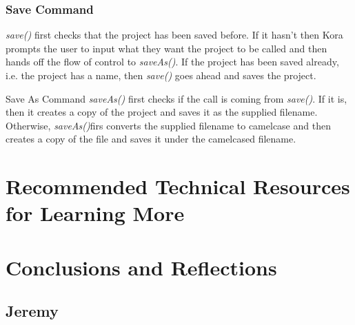 \documentclass[onecolumn, draftclsnofoot,10pt, compsoc]{IEEEtran}
\begin{document}
\subsubsection{Save Command} 
\textit{save()} first checks that the project has been saved before. If it hasn't then Kora prompts the user to input what they want the project to be called and then hands off the flow of control to \textit{saveAs()}. If the project has been saved already, i.e. the project has a name, then \textit{save()} goes ahead and saves the project.


Save As Command  
\textit{saveAs()} first checks if the call is coming from \textit{save()}. If it is, then it creates a copy of the project and saves it as the supplied filename. Otherwise, \textit{saveAs()}firs converts the supplied filename to camelcase and then creates a copy of the file and saves it under the camelcased filename.


	
	
	
	









\section{Recommended Technical Resources for Learning More}











\section{Conclusions and Reflections}


\subsection{Jeremy}
\end{document}
